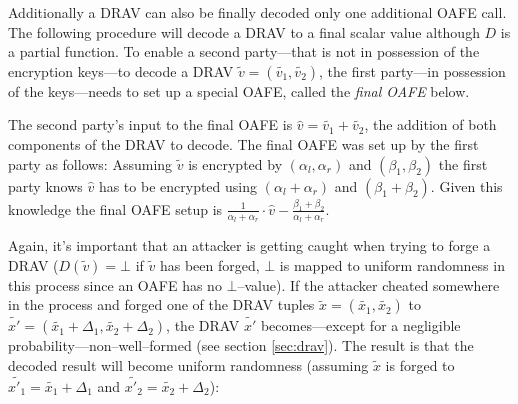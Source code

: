 Additionally a DRAV can also be finally decoded only one additional OAFE call.
The following procedure will decode a DRAV to a final scalar value although
$D$ is a partial function. To enable a second party---that is not in possession
of the encryption keys---to decode a DRAV $\widetilde{v} = (\widetilde{v_1},
\widetilde{v_2})$, the first party---in possession of the keys---needs to set up
a special OAFE, called the \emph{final OAFE} below.

The second party's input to the final OAFE is $\widehat{v} = \widetilde{v_1} +
\widetilde{v_2}$, the addition of both components of the DRAV to decode.  The
final OAFE was set up by the first party as follows: Assuming $\widetilde{v}$ is
encrypted by $(\alpha_l, \alpha_r)$ and $(\beta_1, \beta_2)$ the first party
knows $\widehat{v}$ has to be encrypted using $(\alpha_l + \alpha_r)$ and
$(\beta_1 + \beta_2)$.  Given this knowledge the final OAFE setup is
$\frac{1}{\alpha_l + \alpha_r} \cdot \widehat{v} - \frac{\beta_1 +
\beta_2}{\alpha_l + \alpha_r}$.

Again, it's important that an attacker is getting caught when trying to forge a
DRAV ($D(\widetilde{v}) = \bot$ if $\widetilde{v}$ has been forged, $\bot$ is
mapped to uniform randomness in this process since an OAFE has no
$\bot$--value). If the attacker cheated somewhere in the process and forged one
of the DRAV tuples $\widetilde{x} = (\widetilde{x_1}, \widetilde{x_2})$ to
$\widetilde{x'} = (\widetilde{x_1} + \Delta_1, \widetilde{x_2} + \Delta_2)$, the
DRAV $\widetilde{x'}$ becomes---except for a negligible
probability---non--well--formed (see section \ref{sec:drav}). The result is that
the decoded result will become uniform randomness (assuming $\widetilde{x}$ is
forged to $\widetilde{x'_1} = \widetilde{x_1} + \Delta_1$ and $\widetilde{x'_2}
= \widetilde{x_2} + \Delta_2$):

